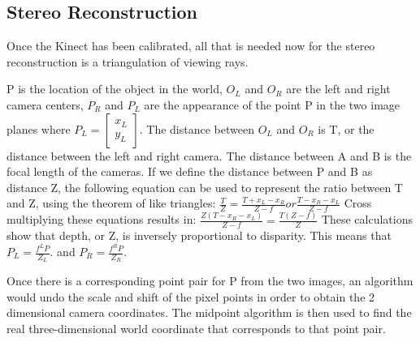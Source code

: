 \documentclass[pdftex,10.5pt]{report}
\begin{document}
\subsection{Stereo Reconstruction}
Once the Kinect has been calibrated, all that is needed now for the stereo reconstruction is a triangulation of viewing rays.

\begin{center}
\end{center}

P is the location of the object in the world, $O_{L}$ and $O_{R}$ are the left and right camera centers, $P_{R}$ and $P_{L}$ are the appearance of the point P in the two image planes where $P_{L}= 
\begin{bmatrix}
x_{L} \\
y_{L} 
\end{bmatrix} $. 
The distance between $O_{L}$ and $O_{R}$ is T, or the distance between the left and right camera. The distance between A and B is the focal length of the cameras. If we define the distance between P and B as distance Z, the following equation  can be used to represent the ratio between T and Z, using the theorem of like triangles: 
$\frac{T}{Z}=\frac{T+x_{L}-x_{R}}{Z-f} or \frac{T-{x_{R}-x_{L}}}{Z-f} $ 
Cross multiplying these equations results in: 
$\frac{Z(T-x_{R}-x_{L})}{Z-f} = \frac{T(Z-f)}{Z} $ 
These calculations show that depth, or Z, is inversely proportional to disparity. This means that  $P_{L}= \frac{f^{L}P}{Z_{L}}. $ and $P_{R}= \frac{f^{R}P}{Z_{R}}. $ 

Once there is a corresponding point pair for P from the two images, an algorithm would undo the scale and shift of the pixel points in order to obtain the 2 dimensional camera coordinates. The midpoint algorithm is then used to find the real three-dimensional world coordinate that corresponds to that point pair.
\end{document}
